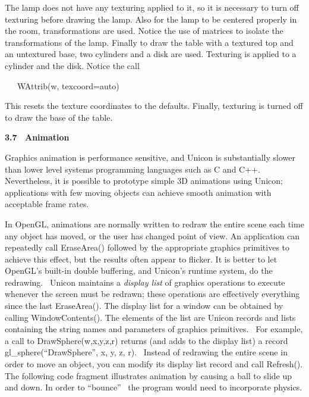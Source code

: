 \documentclass[letterpaper]{article}
\begin{document}
{
The lamp does not have any texturing applied to it, so it is necessary to turn off texturing before drawing the lamp.
Also for the lamp to be centered properly in the room, transformations are used. Notice the use of matrices to isolate
the transformations of the lamp. Finally to draw the table with a textured top and an untextured base, two cylinders
and a disk are used. Texturing is applied to a cylinder and the disk. Notice the call }

{
\ \ \ \textsf{WAttrib(w, {\textquotedbl}texcoord=auto{\textquotedbl})}}

{
This resets the texture coordinates to the defaults. Finally, texturing is turned off to draw the base of the table.}


\bigskip

{\bfseries
3.7 \ Animation}


\bigskip

{
Graphics animation is performance sensitive, and Unicon is substantially slower than lower level systems programming
languages such as C and C++. Nevertheless, it is possible to prototype simple 3D animations using Unicon; applications
with few moving objects can achieve smooth animation with acceptable frame rates.}

{
In OpenGL, animations are normally written to redraw the entire scene each time any object has moved, or the user has
changed point of view. An application can repeatedly call EraseArea() followed by the appropriate graphics primitives
to achieve this effect, but the results often appear to flicker. It is better to let OpenGL's built-in double
buffering, and Unicon's runtime system, do the redrawing. \ Unicon maintains a \textit{display list} of graphics
operations to execute whenever the screen must be redrawn; these operations are effectively everything since the last
EraseArea(). The display list for a window can be obtained by calling WindowContents(). The elements of the list are
Unicon records and lists containing the string names and parameters of graphics primitives. \ For example, a call to
DrawSphere(w,x,y,z,r) returns (and adds to the display list) a record gl\_sphere(``DrawSphere'', x, y, z, r). \ Instead
of redrawing the entire scene in order to move an object, you can modify its display list record and call Refresh().
The following code fragment illustrates animation by causing a ball to slide up and down. In order to ``bounce'' \ the
program would need to incorporate physics. }
\end{document}
